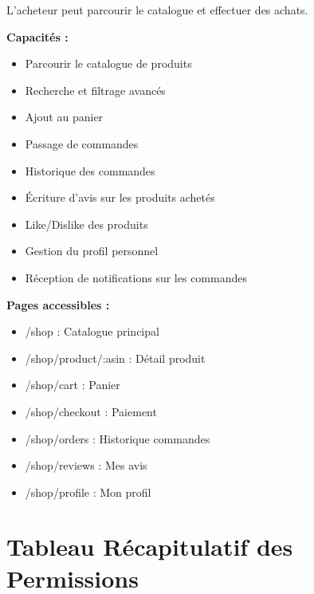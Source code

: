 \documentclass[12pt,a4paper]{report}
\begin{document}
L'acheteur peut parcourir le catalogue et effectuer des achats.

\textbf{Capacités :}
\begin{itemize}[noitemsep]
    \item Parcourir le catalogue de produits
    \item Recherche et filtrage avancés
    \item Ajout au panier
    \item Passage de commandes
    \item Historique des commandes
    \item Écriture d'avis sur les produits achetés
    \item Like/Dislike des produits
    \item Gestion du profil personnel
    \item Réception de notifications sur les commandes
\end{itemize}

\textbf{Pages accessibles :}
\begin{itemize}[noitemsep]
    \item /shop : Catalogue principal
    \item /shop/product/:asin : Détail produit
    \item /shop/cart : Panier
    \item /shop/checkout : Paiement
    \item /shop/orders : Historique commandes
    \item /shop/reviews : Mes avis
    \item /shop/profile : Mon profil
\end{itemize}

\section{Tableau Récapitulatif des Permissions}
\end{document}
